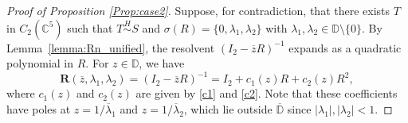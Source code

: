 \documentclass[12pt, reqno]{amsart}
\theoremstyle{definition}
\theoremstyle{remark}
\numberwithin{equation}{section}
\begin{document}
\begin{proof}[Proof of Proposition \ref{Prop:case2}]
	Suppose, for contradiction, that there exists $T$ in $C_2(\mathbb{C}^{5})$ such that $T \stackrel{H}{\sim} S$ and $\sigma(R)=\{0, \lambda_1, \lambda_2\}$ with $\lambda_1, \lambda_2 \in \mathbb{D} \setminus \{0\}$. By Lemma~\ref{lemma:Rn_unified}, the resolvent $(I_2 - \overline{z}R)^{-1}$ expands as a quadratic polynomial in $R$. For $z \in \mathbb{D}$, we have
	\begin{equation}\label{resolvent_expansion}
		\mathbf{R}(\overline{z}, \lambda_1, \lambda_2) = (I_2 - \overline{z}R)^{-1} =  I_2 + c_1(z) R + c_2(z) R^2,
	\end{equation}
	where $c_1(z)$ and $c_2(z)$ are given by \eqref{c1} and \eqref{c2}. Note that these coefficients have poles at $z = 1/\overline{\lambda}_1$ and $z = 1/\overline{\lambda}_2$, which lie outside $\overline{\mathbb{D}}$ since $|\lambda_1|, |\lambda_2| < 1$.
	

\end{proof}
\end{document}
